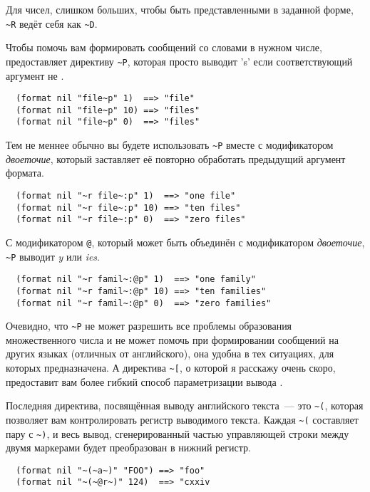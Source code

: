 {Для чисел, слишком больших, чтобы быть представленными в заданной форме, \lstinline!~R!
ведёт себя как \lstinline!~D!.

Чтобы помочь вам формировать сообщений со словами в нужном числе, 
предоставляет директиву \lstinline!~P!, которая просто выводит 's' если соответствующий
аргумент не .

\begin{verbatim}
  (format nil "file~p" 1)  ==> "file"
  (format nil "file~p" 10) ==> "files"
  (format nil "file~p" 0)  ==> "files"
\end{verbatim}

Тем не меннее обычно вы будете использовать \lstinline!~P! вместе с модификатором
\textit{двоеточие}, который заставляет её повторно обработать предыдущий аргумент формата.

\begin{verbatim}
  (format nil "~r file~:p" 1)  ==> "one file"
  (format nil "~r file~:p" 10) ==> "ten files"
  (format nil "~r file~:p" 0)  ==> "zero files"
\end{verbatim}

С модификатором \lstinline!@!, который может быть объединён с модификатором
\textit{двоеточие}, \lstinline!~P! выводит \textit{y} или \textit{ies}.

\begin{verbatim}
  (format nil "~r famil~:@p" 1)  ==> "one family"
  (format nil "~r famil~:@p" 10) ==> "ten families"
  (format nil "~r famil~:@p" 0)  ==> "zero families"
\end{verbatim}

Очевидно, что \lstinline!~P! не может разрешить все проблемы образования множественного
числа и не может помочь при формировании сообщений на других языках (отличных от
английского), она удобна в тех ситуациях, для которых предназначена. А директива
\lstinline!~[!, о которой я расскажу очень скоро, предоставит вам более гибкий способ
параметризации вывода .

Последняя директива, посвящённая выводу английского текста~--- это \lstinline!~(!, которая
позволяет вам контролировать регистр выводимого текста. Каждая \lstinline!~(! составляет
пару с \lstinline!~)!, и весь вывод, сгенерированный частью управляющей строки между двумя
маркерами будет преобразован в нижний регистр.

\begin{verbatim}
  (format nil "~(~a~)" "FOO") ==> "foo"
  (format nil "~(~@r~)" 124)  ==> "cxxiv
\end{verbatim}

}

